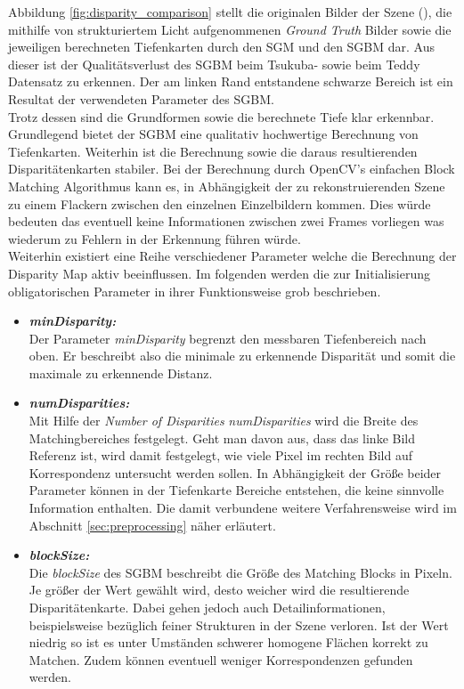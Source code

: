 \noindent
Abbildung \ref{fig:disparity_comparison} stellt die originalen Bilder der Szene (\cite{middlebury_data}), die mithilfe von strukturiertem Licht aufgenommenen \emph{Ground Truth} Bilder sowie die jeweiligen berechneten Tiefenkarten durch den SGM und den SGBM dar. Aus dieser ist der Qualitätsverlust des SGBM beim Tsukuba- sowie beim Teddy Datensatz zu erkennen. Der am linken Rand entstandene schwarze Bereich ist ein Resultat der verwendeten Parameter des SGBM. \\

\noindent
Trotz dessen sind die Grundformen sowie die berechnete Tiefe klar erkennbar. Grundlegend bietet der SGBM eine qualitativ hochwertige Berechnung von Tiefenkarten. Weiterhin ist die Berechnung sowie die daraus resultierenden Disparitätenkarten stabiler. Bei der Berechnung durch OpenCV's einfachen Block Matching Algorithmus kann es, in Abhängigkeit der zu rekonstruierenden Szene zu einem Flackern zwischen den einzelnen Einzelbildern kommen. Dies würde bedeuten das eventuell keine Informationen zwischen zwei Frames vorliegen was wiederum zu Fehlern in der Erkennung führen würde.\\

\noindent
Weiterhin existiert eine Reihe verschiedener Parameter welche die Berechnung der Disparity Map aktiv beeinflussen. Im folgenden werden die zur Initialisierung obligatorischen Parameter in ihrer Funktionsweise grob beschrieben.

\begin{itemize}
	\item \textbf{\emph{minDisparity:}}\\
	Der Parameter \emph{minDisparity} begrenzt den messbaren Tiefenbereich nach oben. Er beschreibt also die minimale zu erkennende Disparität und somit die maximale zu erkennende Distanz.
 	\item \textbf{\emph{numDisparities:}}\\
 	Mit Hilfe der \emph{Number of Disparities} \emph{numDisparities} wird die Breite des Matchingbereiches festgelegt. Geht man davon aus, dass das linke Bild Referenz ist, wird damit festgelegt, wie viele Pixel im rechten Bild auf Korrespondenz untersucht werden sollen. In Abhängigkeit der Größe beider Parameter können in der Tiefenkarte Bereiche entstehen, die keine sinnvolle Information enthalten. Die damit verbundene weitere Verfahrensweise wird im Abschnitt \ref{sec:preprocessing} näher erläutert.
	\item \textbf{\emph{blockSize:}}\\
	Die \emph{blockSize} des SGBM beschreibt die Größe des Matching Blocks in Pixeln. Je größer der Wert gewählt wird, desto weicher wird die resultierende Disparitätenkarte. Dabei gehen jedoch auch Detailinformationen, beispielsweise bezüglich feiner Strukturen in der Szene verloren. Ist der Wert niedrig so ist es unter Umständen schwerer homogene Flächen korrekt zu Matchen. Zudem können eventuell weniger Korrespondenzen gefunden werden.
\end{itemize}

